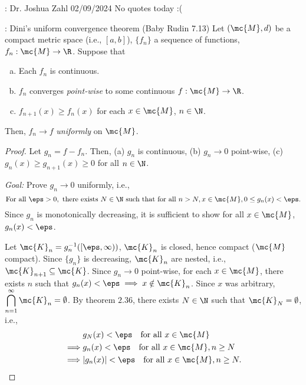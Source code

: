 \begin{nquote}{: Dr. Joshua Zahl 02/09/2024}
	No quotes today :(
\end{nquote}

\begin{ntheorem}{: Dini's uniform convergence theorem (Baby Rudin 7.13)}
	Let \((\mc{M},d)\) be a compact metric space (i.e., \([a,b]\)), \(\{f_n\}\) a sequence of functions, \(f_n:\mc{M}\to\R\). Suppose that 
	\begin{enumerate}[(a)]
		\item Each \(f_n\) is continuous.
		
		\item \(f_n\) converges \emph{point-wise} to some continuous \(f:\mc{M}\to\R\).
		
		\item \(f_{n+1}(x)\geq f_n(x)\) for each \(x\in\mc{M}\), \(n\in\N\).
	\end{enumerate}
	Then, \(f_n\to f\) \emph{uniformly} on \(\mc{M}\).
\end{ntheorem}
\begin{proof}
	Let \(g_n=f-f_n\). Then, (a) \(g_n\) is continuous, (b) \(g_n\to 0\) point-wise, (c) \(g_n(x)\geq g_{n+1}(x)\geq 0\) for all \(n\in\N\).
	
	\medskip
	
	\emph{Goal:} Prove \(g_n\to 0\) uniformly, i.e., 
	\begin{equation*}
		\text{For all}~\eps>0,~\text{there exists}~N\in\N~\text{such that for all}~n>N, x\in\mc{M},0\leq g_n(x)<\eps.
	\end{equation*}
	Since \(g_n\) is monotonically decreasing, it is sufficient to show for all \(x\in\mc{M}\), \(g_n(x)<\eps\).
	
	\medskip
	
	Let \(\mc{K}_n=g_n^{-1}([\eps,\infty))\), \(\mc{K}_n\) is closed, hence compact (\(\mc{M}\) compact). Since \(\{g_n\}\) is decreasing, \(\mc{K}_n\) are nested, i.e., \(\mc{K}_{n+1}\subseteq\mc{K}\). Since \(g_n\to 0\) point-wise, for each \(x\in\mc{M}\), there exists \(n\) such that \(g_n(x)<\eps\implies x\notin\mc{K}_n\). Since \(x\) was arbitrary, \(\displaystyle\bigcap_{n=1}^{\infty}\mc{K}_n=\emptyset\). By theorem \(2.36\), there exists \(N\in\N\) such that \(\mc{K}_N=\emptyset\), i.e., 
	\begin{align*}
		&g_N(x)<\eps\quad\text{for all}~x\in\mc{M}\\
		\implies&g_n(x)<\eps\quad\text{for all}~x\in\mc{M}, n\geq N\\
		\implies&|g_n(x)|<\eps\quad\text{for all}~x\in\mc{M}, n\geq N.
	\end{align*}
\end{proof}

